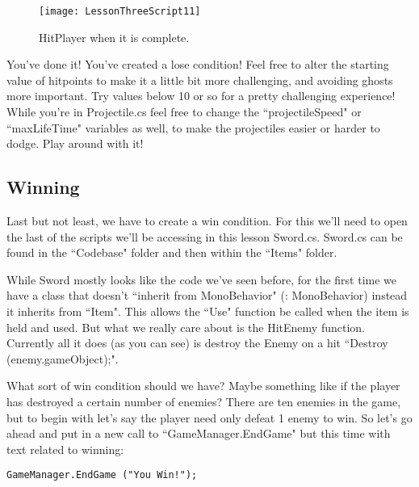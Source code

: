 \documentclass{article}
\begin{document}
\begin{figure}
  \texttt{[image: LessonThreeScript11]}
  \caption{HitPlayer when it is complete.}
  \label{fig:LessonThreeScript11}
\end{figure}

\noindent{}

You've done it! You've created a lose condition! Feel free to alter the starting value of hitpoints to make it a little bit more challenging, and avoiding ghosts more important. Try values below 10 or so for a pretty challenging experience! While you're in Projectile.cs feel free to change the ``projectileSpeed" or ``maxLifeTime" variables as well, to make the projectiles easier or harder to dodge. Play around with it! 

\subsection{Winning}

Last but not least, we have to create a win condition. For this we'll need to open the last of the scripts we'll be accessing in this lesson Sword.cs. Sword.cs can be found in the ``Codebase" folder and then within the ``Items" folder. 

While Sword mostly looks like the code we've seen before, for the first time we have a class that doesn't ``inherit from MonoBehavior" (: MonoBehavior) instead it inherits from ``Item". This allows the ``Use" function be called when the item is held and used. But what we really care about is the HitEnemy function. Currently all it does (as you can see) is destroy the Enemy on a hit ``Destroy (enemy.gameObject);". 

What sort of win condition should we have? Maybe something like if the player has destroyed a certain number of enemies? There are ten enemies in the game, but to begin with let's say the player need only defeat 1 enemy to win. So let's go ahead and put in a new call to ``GameManager.EndGame" but this time with text related to winning: 

\lstset{style=sharpc}
\begin{lstlisting}
GameManager.EndGame ("You Win!");
\end{lstlisting}
\end{document}
